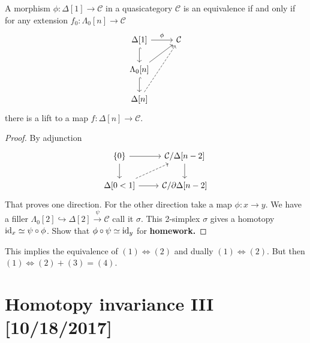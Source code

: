 \documentclass{amsart}
\begin{document}
\begin{proposition}[HTT 1.2.4.3]
    A morphism $\phi:\Delta[1]\to\mathcal{C}$ in a quasicategory $\mathcal{C}$ is
    an equivalence if and only if for any extension $f_0:\Lambda_0[n]\to\mathcal{C}$
    \begin{equation*}
        \begin{tikzcd}
            \Delta[1] \dar[hook] \rar{\phi} & \mathcal{C}\\
            \Lambda_0[n]\dar[hook] \ar[ur]{f_0} & \\
            \Delta[n]\ar[uur,dashed]{f} &
        \end{tikzcd}
    \end{equation*}
    there is a lift to a map $f:\Delta[n]\to\mathcal{C}$.
\end{proposition}
\begin{proof}
    By adjunction
    \begin{equation*}
        \begin{tikzcd}
            \{0\} \rar\dar & \mathcal{C}/\Delta[n-2]\dar \\
            \Delta[0<1] \rar\ar[ur,dashed] & \mathcal{C}/\partial\Delta[n-2]
        \end{tikzcd}
    \end{equation*}
    That proves one direction. For the other direction take a map $\phi:x\to y$.
    We have a filler $\Lambda_0[2]\hookrightarrow\Delta[2]\xrightarrow{\psi} \mathcal{C}$ call it $\sigma$.
    This 2-simplex $\sigma$ gives a homotopy $\operatorname{id}_x\simeq \psi\circ\phi$. Show that
    $\phi\circ\psi\simeq \operatorname{id}_y$ for \textbf{homework.}
\end{proof}

This implies the equivalence of $(1)\iff (2)$ and dually $(1)\iff (2)$. But
then $(1)\iff (2)+(3)=(4)$.

\newpage

\section{Homotopy invariance III [10/18/2017]}
\end{document}
